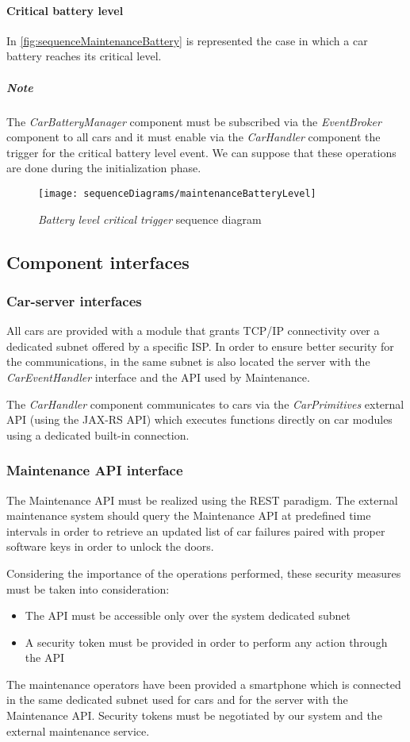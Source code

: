 \paragraph{Critical battery level}In \autoref{fig:sequenceMaintenanceBattery} is represented the case in which a car battery reaches its critical level.
\subparagraph{Note} The \emph{CarBatteryManager} component must be subscribed via the \mbox{\emph{EventBroker}} component to all cars and it must enable via the \emph{CarHandler} component the trigger for the critical battery level event. We can suppose that these operations are done during the initialization phase.
\begin{figure}[h!]
	\centering
	\texttt{[image: sequenceDiagrams/maintenanceBatteryLevel]}
	\caption{
		\label{fig:sequenceMaintenanceBattery} 
		\emph{Battery level critical trigger} sequence diagram
	}
\end{figure}

\clearpage
\subsection{Component interfaces}

\subsubsection{Car-server interfaces}
All cars are provided with a module that grants TCP/IP connectivity over a dedicated subnet offered by a specific ISP. In order to ensure better security for the communications, in the same subnet is also located the server with the \mbox{\emph{CarEventHandler}} interface and the API used by Maintenance.

The \emph{CarHandler} component communicates to cars via the \mbox{\emph{CarPrimitives}} external API (using the JAX-RS API) which executes functions directly on car modules using a dedicated built-in connection.

\subsubsection{Maintenance API interface}
The Maintenance API must be realized using the REST paradigm. The external maintenance system should query the Maintenance API at predefined time intervals in order to retrieve an updated list of car failures paired with proper software keys in order to unlock the doors.

Considering the importance of the operations performed, these security measures must be taken into consideration:
\begin{itemize}
	\item The API must be accessible only over the system dedicated subnet
	\item A security token must be provided in order to perform any action through the API
\end{itemize}
The maintenance operators have been provided a smartphone which is connected in the same dedicated subnet used for cars and for the server with the Maintenance API.
Security tokens must be negotiated by our system and the external maintenance service.

